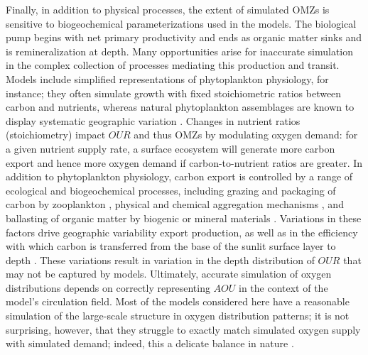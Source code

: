 \documentclass[draft,linenumbers]{report_chapter}
\begin{document}
Finally, in addition to physical processes, the extent of simulated OMZs is sensitive to biogeochemical parameterizations used in the models.
The biological pump begins with net primary productivity and ends as organic matter sinks and is remineralization at depth.
Many opportunities arise for inaccurate simulation in the complex collection of processes mediating this production and transit.
Models include simplified representations of phytoplankton physiology, for instance; they often simulate growth with fixed stoichiometric ratios between carbon and nutrients, whereas natural phytoplankton assemblages are known to display systematic geographic variation \citep{Devries-Deutsch-2014}.
Changes in nutrient ratios (stoichiometry) impact $OUR$ and thus OMZs by modulating oxygen demand: for a given nutrient supply rate, a surface ecosystem will generate more carbon export and hence more oxygen demand if carbon-to-nutrient ratios are greater.
In addition to phytoplankton physiology, carbon export is controlled by a range of ecological and biogeochemical processes, including grazing and packaging of carbon by zooplankton \citep[e.g.,][]{Wilson-Steinberg-2010}, physical and chemical aggregation mechanisms \citep{Passow-2002,Burd-Jackson-2009}, and ballasting of organic matter by biogenic or mineral materials \citep{Armstrong-Lee-etal-2002,Klaas-Archer-2002}.
Variations in these factors drive geographic variability export production, as well as in the efficiency with which carbon is transferred from the base of the sunlit surface layer to depth \citep{Buesseler-Boyd-2009,Weber-Cram-etal-2016}. These variations result in variation in the depth distribution of $OUR$ that may not be captured by models.
Ultimately, accurate simulation of oxygen distributions depends on correctly representing $AOU$ in the context of the model's circulation field.
Most of the models considered here have a reasonable simulation of the large-scale structure in oxygen distribution patterns; it is not surprising, however, that they struggle to exactly match simulated oxygen supply with simulated demand; indeed, this a delicate balance in nature \citep{Watson-Lenton-etal-2017}.
\end{document}
